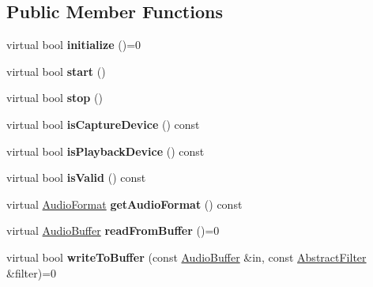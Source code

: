 \subsection*{Public Member Functions}
\begin{DoxyCompactItemize}
\item 
\hypertarget{class_audio_d_x_1_1_abstract_audio_device_a8bc151d485fbbea83d16e15abcc10df2}{virtual bool {\bfseries initialize} ()=0}\label{class_audio_d_x_1_1_abstract_audio_device_a8bc151d485fbbea83d16e15abcc10df2}

\item 
\hypertarget{class_audio_d_x_1_1_abstract_audio_device_a165b72ae32ab24d88018a2c4c7acd188}{virtual bool {\bfseries start} ()}\label{class_audio_d_x_1_1_abstract_audio_device_a165b72ae32ab24d88018a2c4c7acd188}

\item 
\hypertarget{class_audio_d_x_1_1_abstract_audio_device_aed3aa99e6eddb1ccb31e9c467afacc8e}{virtual bool {\bfseries stop} ()}\label{class_audio_d_x_1_1_abstract_audio_device_aed3aa99e6eddb1ccb31e9c467afacc8e}

\item 
\hypertarget{class_audio_d_x_1_1_abstract_audio_device_a5aa3d081130b952871e704d7ff005ec0}{virtual bool {\bfseries is\-Capture\-Device} () const }\label{class_audio_d_x_1_1_abstract_audio_device_a5aa3d081130b952871e704d7ff005ec0}

\item 
\hypertarget{class_audio_d_x_1_1_abstract_audio_device_a503b2a592b55b25903cc3f3e5389bd35}{virtual bool {\bfseries is\-Playback\-Device} () const }\label{class_audio_d_x_1_1_abstract_audio_device_a503b2a592b55b25903cc3f3e5389bd35}

\item 
\hypertarget{class_audio_d_x_1_1_abstract_audio_device_a35eddb40741fef8b011058cdef1c9daa}{virtual bool {\bfseries is\-Valid} () const }\label{class_audio_d_x_1_1_abstract_audio_device_a35eddb40741fef8b011058cdef1c9daa}

\item 
\hypertarget{class_audio_d_x_1_1_abstract_audio_device_a3910313a0578fa3c2b06501cc179af28}{virtual \hyperlink{struct_audio_d_x_1_1_audio_format}{Audio\-Format} {\bfseries get\-Audio\-Format} () const }\label{class_audio_d_x_1_1_abstract_audio_device_a3910313a0578fa3c2b06501cc179af28}

\item 
\hypertarget{class_audio_d_x_1_1_abstract_audio_device_a0c1724ac52fe657184986053994254f0}{virtual \hyperlink{class_audio_d_x_1_1_audio_buffer}{Audio\-Buffer} {\bfseries read\-From\-Buffer} ()=0}\label{class_audio_d_x_1_1_abstract_audio_device_a0c1724ac52fe657184986053994254f0}

\item 
\hypertarget{class_audio_d_x_1_1_abstract_audio_device_af7a91b536071e36806f1fc7eb029f872}{virtual bool {\bfseries write\-To\-Buffer} (const \hyperlink{class_audio_d_x_1_1_audio_buffer}{Audio\-Buffer} \&in, const \hyperlink{struct_audio_d_x_1_1_abstract_filter}{Abstract\-Filter} \&filter)=0}\label{class_audio_d_x_1_1_abstract_audio_device_af7a91b536071e36806f1fc7eb029f872}

\end{DoxyCompactItemize}
